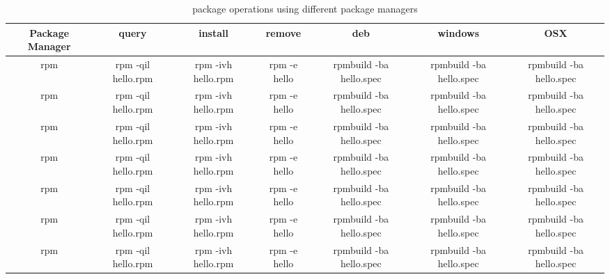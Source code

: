 \begin{sidewaystable}[h]
\caption{package operations using different package managers} %
\centering  %
\begin{tabular}{c c c c c c c} %
\hline\hline                        %
Package Manager & query & install & remove & deb & windows & OSX \\ [0.5ex] %
\hline                 %
rpm   & rpm -qil hello.rpm  & rpm -ivh hello.rpm & rpm -e hello  & rpmbuild -ba hello.spec & rpmbuild -ba hello.spec & rpmbuild -ba hello.spec  \\ [0.5ex] %
rpm   & rpm -qil hello.rpm  & rpm -ivh hello.rpm & rpm -e hello  & rpmbuild -ba hello.spec & rpmbuild -ba hello.spec & rpmbuild -ba hello.spec  \\ [0.5ex] %
rpm   & rpm -qil hello.rpm  & rpm -ivh hello.rpm & rpm -e hello  & rpmbuild -ba hello.spec & rpmbuild -ba hello.spec & rpmbuild -ba hello.spec  \\ [0.5ex] %
rpm   & rpm -qil hello.rpm  & rpm -ivh hello.rpm & rpm -e hello  & rpmbuild -ba hello.spec & rpmbuild -ba hello.spec & rpmbuild -ba hello.spec  \\ [0.5ex] %
rpm   & rpm -qil hello.rpm  & rpm -ivh hello.rpm & rpm -e hello  & rpmbuild -ba hello.spec & rpmbuild -ba hello.spec & rpmbuild -ba hello.spec  \\ [0.5ex] %
rpm   & rpm -qil hello.rpm  & rpm -ivh hello.rpm & rpm -e hello  & rpmbuild -ba hello.spec & rpmbuild -ba hello.spec & rpmbuild -ba hello.spec  \\ [0.5ex] %
rpm   & rpm -qil hello.rpm  & rpm -ivh hello.rpm & rpm -e hello  & rpmbuild -ba hello.spec & rpmbuild -ba hello.spec & rpmbuild -ba hello.spec  \\ [0.5ex] %

\hline %
\end{tabular}
\label{table:comparsion} %
\end{sidewaystable}
